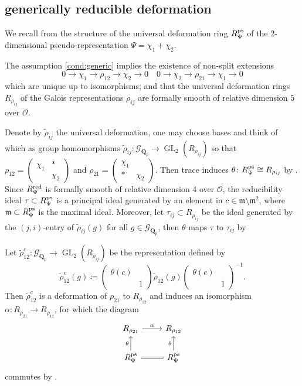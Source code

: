\documentclass[leqno]{amsart}
\newcommand{\smat}[1]{\left( \begin{smallmatrix} #1 \end{smallmatrix} \right)}
\newcommand{\Gp}{\mathcal{G}_{\Qp}} %
\newcommand{\ps}{\textnormal{ps}}
\newcommand{\red}{\textnormal{red}}
\DeclareMathOperator{\GL}{GL}
\newcommand{\Qp}{\mathbf{Q}_p}
\newcommand{\oo}{\mathcal{O}} %
\newcommand{\fm}{\mathfrak{m}}
\theoremstyle{definition}
\theoremstyle{remark}
\begin{document}
\subsection{generically reducible deformation}

We recall from \cite[\S B.1]{pask}
the structure of the universal deformation ring $R_{\Psi}^{\ps}$
of the $2$-dimensional pseudo-representation $\Psi=\chi_1+\chi_2$. 

The assumption \eqref{cond:generic}
implies the existence of non-split extensions
\begin{equation*}
    0\to \chi_1\to \rho_{12}\to \chi_2\to 0\quad
    0\to \chi_2\to \rho_{21}\to \chi_1\to 0
\end{equation*}
which are unique up to isomorphisms;
and that the universal deformation rings
$R_{\rho_{ij}}$ of the Galois representations $\rho_{ij}$
are formally smooth of relative dimension $5$ over $\oo$.

Denote by $\tilde{\rho}_{ij}$ the universal deformation,
one may choose bases and think of which as group homomorphisms
$\tilde{\rho}_{ij}\colon \Gp\to \GL_2(R_{\rho_{ij}})$
so that 
$\rho_{12}=\smat{\chi_1&*\\&\chi_2}$ and
$\rho_{21}=\smat{\chi_1&\\ * &\chi_2}$.
Then trace induces $\theta\colon R_{\Psi}^{\ps}\cong R_{\rho_{ij}}$ by \cite[Prop B.17]{pask}.
Since $R^{\red}_{\Psi}$ is formally smooth of relative dimension $4$ over $\oo$,
the reducibility ideal  $\tau\subset R_{\Psi}^{\ps}$ is a principal ideal generated by 
an element in $c\in\fm\setminus \fm^2$,
where $\fm\subset R_{\Psi}^{\ps}$ is the maximal ideal. 
Moreover, let $\tau_{ij}\subset R_{\rho_{ij}} $ be the ideal 
generated by the $(j,i)$-entry of  $ \tilde{\rho}_{ij}(g)$
for all $g\in \Gp$,
then  $\theta$ maps  $\tau$ to  $\tau_{ij}$ by \cite[Prop B.23]{pask}

Let $\tilde{\rho}_{12}^c\colon \Gp\to \GL_2(R_{\rho_{ij}})$ be the representation defined by
\begin{equation*}
	\tilde{\rho}_{12}^c(g)\coloneqq 
	\smat{\theta(c)&\\&1}
	\tilde{\rho}_{12}(g)
	\smat{\theta(c)&\\&1}^{-1}.
\end{equation*}
Then $ \tilde{\rho}_{12}^c$ is a deformation of $\rho_{21}$ to $R_{\rho_{12}}$
and induces an isomorphism $\alpha\colon R_{\rho_{21}}\to R_{\rho_{12}}$,
for which the diagram
\begin{equation*}
	\begin{tikzcd}
		R_{\rho_{21}} \arrow[r,"\alpha"] &
		R_{\rho_{12}}\\
		R_{\Psi}^{\ps} \arrow[u,"\theta"] \arrow[r,equal] &
		R_{\Psi}^{\ps} \arrow[u,"\theta"]
	\end{tikzcd}
\end{equation*}
commutes by \cite[Prop B.24]{pask}.
\end{document}
